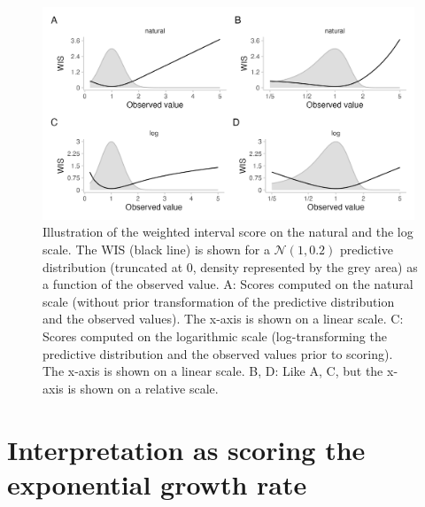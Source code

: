 \documentclass{article}
\begin{document}
\begin{figure}[h!]
    \centering
    \includegraphics[width=0.99\textwidth]{output/figures/SIM-effect-log-score.png}
    \caption{Illustration of the weighted interval score on the natural and the log scale. The WIS
    (black line) is shown for a $\mathcal{N}(1, 0.2)$ predictive distribution (truncated at 0, density represented by the grey area) as a function of the observed value. 
    A: Scores computed on the natural scale (without prior transformation of the predictive distribution and the observed values). The x-axis is shown on a linear scale. C: Scores computed on the logarithmic scale (log-transforming the predictive distribution and the observed values prior to scoring). The x-axis is shown on a linear scale. B, D: Like A, C, but the x-axis is shown on a relative scale.} 
    \label{fig:change-in-scores}
\end{figure}


\section{Interpretation as scoring the exponential growth rate}
\label{sec:methods:growthrate}
\end{document}
